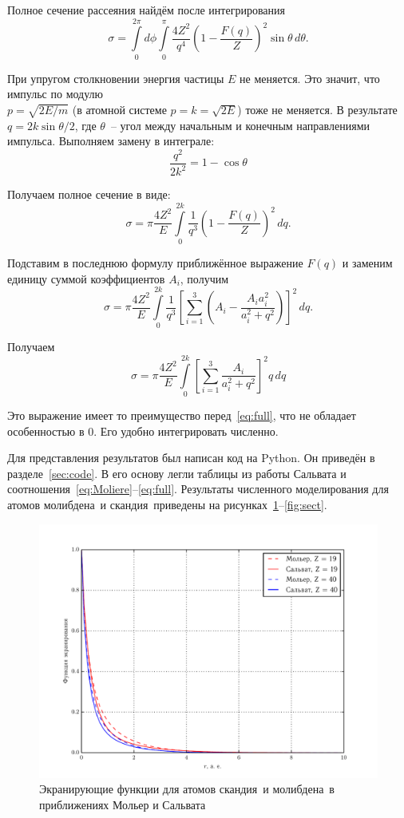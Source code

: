 \documentclass[10pt,pscyr]{hedlab}
\newcommand{\fiat}{скандия~}
\newcommand{\seat}{молибдена~}
\newcommand{\eq}  [1]{\eqref{eq:#1}}
\newcommand{\fig} [1]{\ref{fig:#1}}
\newcommand{\sect}[1]{\ref{sec:#1}}
\begin{document}
  Полное сечение рассеяния найдём после интегрирования 
  \begin{equation}
    \sigma = \int\limits_0^{2\pi} d\phi \int\limits_0^\pi \frac{4Z^2}{q^4}
      \left( 1 - \frac{F(q)}{Z} \right)^2 \sin\theta\,d\theta.
  \end{equation}
 
  При упругом столкновении энергия частицы \( E \) не меняется. Это
  значит, что импульс по модулю \\ \( p = \sqrt{2E/m} \) (в атомной системе
  \( p = k = \sqrt{2E} \)) тоже не меняется. В результате
  \( q = 2 k \sin \theta / 2\), где \( \theta \)~-- угол между начальным и
  конечным направлениями импульса. Выполняем замену в интеграле:
  \[
    \frac{q^2}{2k^2} = 1-\cos \theta
  \]

  Получаем полное сечение в виде:
  \begin{equation}
    \sigma = \pi \frac{4Z^2}{E} \int\limits_0^{2k} \frac{1}{q^3}
      \left( 1 - \frac{F(q)}{Z} \right)^2\,dq.
    \label{eq:full}
  \end{equation}

  Подставим в последнюю формулу приближённое выражение \( F(q) \)
  и заменим единицу суммой коэффициентов \( A_i \), получим
  \[
    \sigma = \pi \frac{4Z^2}{E} \int\limits_0^{2k} \frac{1}{q^3}
      \left[ \sum_{i = 1}^3 \left( A_i - \frac{A_ia_i^2}{a_i^2 + q^2} \right)
      \right]^2\,dq.
  \]

  Получаем
  \begin{equation}
    \sigma = \pi \frac{4Z^2}{E} \int\limits_0^{2k}
      \left[ \sum_{i = 1}^3 \frac{A_i}{a_i^2 + q^2}  \right]^2 q\,dq
    \label{eq:sect}
  \end{equation}

  Это выражение имеет то преимущество перед~\eq{full}, что
  не обладает особенностью в 0. Его удобно интегрировать
  численно.
  
  Для представления результатов был написан код на Python.
  Он приведён в разделе~\sect{code}. В его основу легли
  таблицы из работы Сальвата и
  соотношения~\eq{Moliere}--\eq{full}. Результаты численного
  моделирования для атомов \seat и \fiat приведены на
  рисунках~\fig{screening}--\fig{sect}.

  \begin{figure}[h!]
    \centering
    \includegraphics[width=.7\textwidth]{screening}
    \caption{Экранирующие функции для атомов \fiat и
      \seat в приближениях Мольер и Сальвата}
    \label{fig:screening}
    \end{figure}
  
\end{document}
